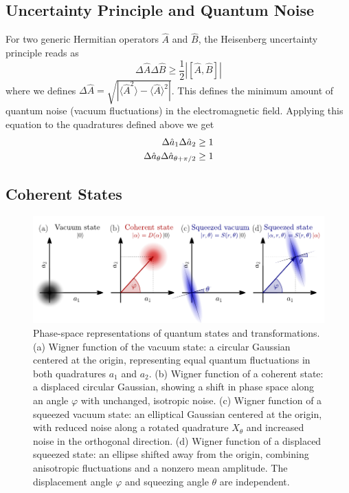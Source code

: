 \subsection*{Uncertainty Principle and Quantum Noise}

For two generic Hermitian operators $\hat{A}$ and $\hat{B}$, the Heisenberg uncertainty principle reads as 
\begin{equation}
  \Delta \hat{A}\Delta \hat{B} \geq \frac{1}{2} |[\hat{A}, \hat{B}]|
\end{equation}
where we defines $\Delta \hat{A}=\sqrt{|\langle \hat{A}^2\rangle - \langle \hat{A} \rangle^2|}$. This defines the minimum amount of quantum noise (vacuum fluctuations) in the electromagnetic field.
Applying this equation to the quadratures defined above we get 
\begin{equation}
   \begin{split}
    \Delta \hat{a}_{1} \Delta \hat{a}_{2} &\geq 1 \\
    \Delta \hat{a}_{\theta \vphantom{\pi/2}} \Delta \hat{a}_{\theta +\pi/2} &\geq 1
   \end{split}
\end{equation}
\subsection*{Coherent States}


\begin{figure}
\centering
\includegraphics[width=\textwidth]{./chap2/fig/quantumstates (2).pdf}
\caption{Phase-space representations of quantum states and transformations.
(a) Wigner function of the vacuum state: a circular Gaussian centered at the origin, representing equal quantum fluctuations in both quadratures $a_1$ and $a_2$.
(b) Wigner function of a coherent state: a displaced circular Gaussian, showing a shift in phase space along an angle $\varphi$ with unchanged, isotropic noise.
(c) Wigner function of a squeezed vacuum state: an elliptical Gaussian centered at the origin, with reduced noise along a rotated quadrature $X_\theta$ and increased noise in the orthogonal direction.
(d) Wigner function of a displaced squeezed state: an ellipse shifted away from the origin, combining anisotropic fluctuations and a nonzero mean amplitude. The displacement angle $\varphi$ and squeezing angle $\theta$ are independent.} 
\end{figure}

